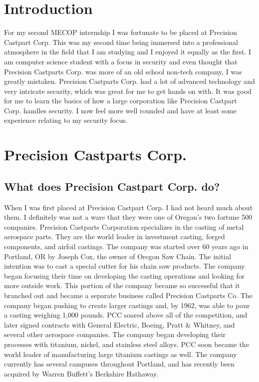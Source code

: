 \documentclass[letterpaper,10pt,notitlepage,fleqn]{article}
\begin{document}
\tableofcontents
\newpage

\section{Introduction}
\indent For my second MECOP internship I was fortunate to be placed at Precision Castpart Corp. This 
was my second time being immersed into a professional atmosphere in the field that 
I am studying and I enjoyed it equally as the first. I am computer science student with a focus 
in security and even thought that Precision Castparts Corp. was more of an old school 
non-tech company, I was greatly mistaken. Precision Castparts Corp. had a lot of advanced 
technology and very intricate security, which was great for me to get hands on with. It was 
good for me to learn the basics of how a large corporation like Precision Castpart Corp. 
handles security. I now feel more well rounded and have at least some experience relating to
my security focus.

\section{Precision Castparts Corp.}

\subsection{What does Precision Castpart Corp. do?}
\indent When I was first placed at Precision Castpart Corp. I had not heard much about them. I 
definitely was not a ware that they were one of Oregon's two fortune 500 companies.
Precision Castparts Corporation specializes in the casting of metal aerospace parts. 
They are the world leader in investment casting, forged components, and airfoil castings. 
The company was started over 60 years ago in Portland, OR by Joseph Cox, the owner of 
Oregon Saw Chain. The initial intention was to cast a special cutter for his chain saw 
products. The company began focusing their time on developing the casting operations 
and looking for more outside work. This portion of the company became so successful that 
it branched out and became a separate business called Precision Castparts Co. The company 
began pushing to create larger castings and, by 1962, was able to pour a casting weighing 
1,000 pounds. PCC soared above all of the competition, and later signed contracts with 
General Electric, Boeing, Pratt \& Whitney, and several other aerospace companies. The company 
began developing their processes with titanium, nickel, and stainless steel alloys. PCC soon
became the world leader of manufacturing large titanium castings as well. The company currently 
has several campuses throughout Portland, and has recently been acquired by Warren 
Buffett's Berkshire Hathaway.
\end{document}
